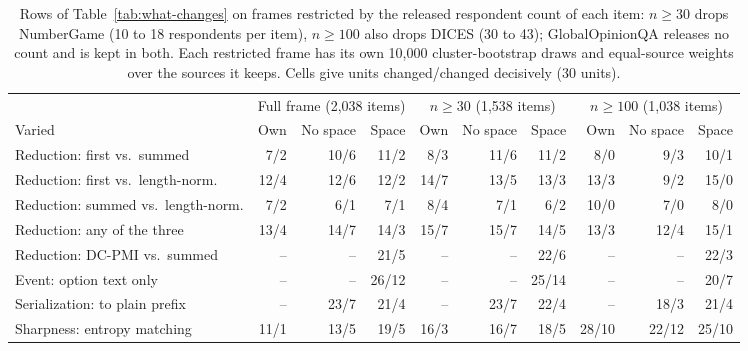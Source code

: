 \begin{table}[t]
\centering\scriptsize
\setlength{\tabcolsep}{3pt}
\begin{tabular}{@{}lrrrrrrrrr@{}}
\toprule
& \multicolumn{3}{c}{Full frame (2,038 items)} & \multicolumn{3}{c}{$n\ge30$ (1,538 items)} & \multicolumn{3}{c}{$n\ge100$ (1,038 items)} \\
\cmidrule(lr){2-4}\cmidrule(lr){5-7}\cmidrule(l){8-10}
Varied & Own & No space & Space & Own & No space & Space & Own & No space & Space \\
\midrule
Reduction: first vs.\ summed & 7/2 & 10/6 & 11/2 & 8/3 & 11/6 & 11/2 & 8/0 & 9/3 & 10/1 \\
Reduction: first vs.\ length-norm. & 12/4 & 12/6 & 12/2 & 14/7 & 13/5 & 13/3 & 13/3 & 9/2 & 15/0 \\
Reduction: summed vs.\ length-norm. & 7/2 & 6/1 & 7/1 & 8/4 & 7/1 & 6/2 & 10/0 & 7/0 & 8/0 \\
Reduction: any of the three & 13/4 & 14/7 & 14/3 & 15/7 & 15/7 & 14/5 & 13/3 & 12/4 & 15/1 \\
Reduction: DC-PMI vs.\ summed & -- & -- & 21/5 & -- & -- & 22/6 & -- & -- & 22/3 \\
Event: option text only & -- & -- & 26/12 & -- & -- & 25/14 & -- & -- & 20/7 \\
Serialization: to plain prefix & -- & 23/7 & 21/4 & -- & 23/7 & 22/4 & -- & 18/3 & 21/4 \\
Sharpness: entropy matching & 11/1 & 13/5 & 19/5 & 16/3 & 16/7 & 18/5 & 28/10 & 22/12 & 25/10 \\
\bottomrule
\end{tabular}
\caption{Rows of Table~\ref{tab:what-changes} on frames restricted by the released respondent count of each item: $n\ge30$ drops NumberGame (10 to 18 respondents per item), $n\ge100$ also drops DICES (30 to 43); GlobalOpinionQA releases no count and is kept in both. Each restricted frame has its own 10,000 cluster-bootstrap draws and equal-source weights over the sources it keeps. Cells give units changed/changed decisively (30 units).}
\label{tab:respondent-floor}
\end{table}
